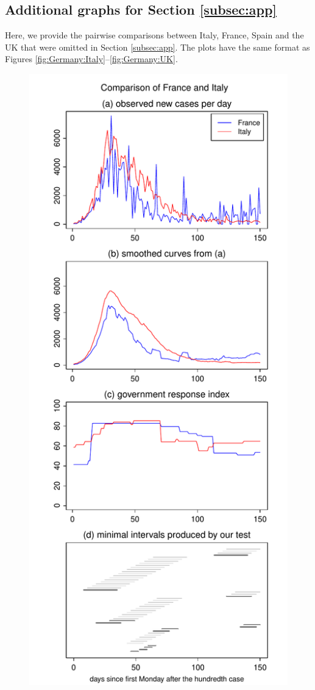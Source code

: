 \documentclass[a4paper,12pt]{article}
\numberwithin{equation}{section}
\begin{document}
\newpage

\subsection{Additional graphs for Section \ref{subsec:app}}\label{s:subsec:app}


Here, we provide the pairwise comparisons between Italy, France, Spain and the UK that were omitted in Section \ref{subsec:app}. The plots have the same format as Figures \ref{fig:Germany:Italy}--\ref{fig:Germany:UK}. 


\begin{figure}[h!]
\begin{minipage}[t]{0.49\textwidth}
\includegraphics[width=\textwidth]{plots/FRA_vs_ITA_Monday}

\end{minipage}
\end{figure}
\end{document}

